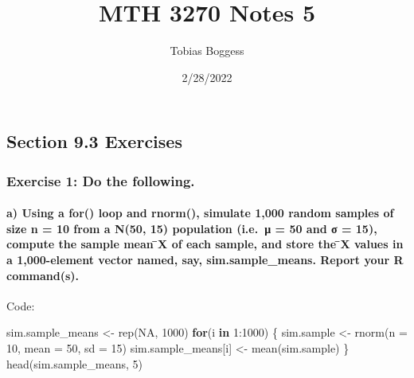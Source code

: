 \documentclass[
]{article}
\title{MTH 3270 Notes 5}
\author{Tobias Boggess}
\date{2/28/2022}
\newenvironment{Shaded}{\begin{snugshade}}{\end{snugshade}}
\newcommand{\AttributeTok}[1]{\textcolor[rgb]{0.77,0.63,0.00}{#1}}
\newcommand{\ConstantTok}[1]{\textcolor[rgb]{0.00,0.00,0.00}{#1}}
\newcommand{\ControlFlowTok}[1]{\textcolor[rgb]{0.13,0.29,0.53}{\textbf{#1}}}
\newcommand{\DecValTok}[1]{\textcolor[rgb]{0.00,0.00,0.81}{#1}}
\newcommand{\FunctionTok}[1]{\textcolor[rgb]{0.00,0.00,0.00}{#1}}
\newcommand{\NormalTok}[1]{#1}
\newcommand{\OtherTok}[1]{\textcolor[rgb]{0.56,0.35,0.01}{#1}}
\newcommand{\SpecialCharTok}[1]{\textcolor[rgb]{0.00,0.00,0.00}{#1}}
\begin{document}
\maketitle

\hypertarget{section-9.3-exercises}{%
\subsection{Section 9.3 Exercises}\label{section-9.3-exercises}}

\hypertarget{exercise-1-do-the-following.}{%
\subsubsection{Exercise 1: Do the
following.}\label{exercise-1-do-the-following.}}

\hypertarget{a-using-a-for-loop-and-rnorm-simulate-1000-random-samples-of-size-n-10-from-a-n50-15-population-i.e.-ux3bc-50-and-ux3c3-15-compute-the-sample-mean-x-of-each-sample-and-store-the-x-values-in-a-1000-element-vector-named-say-sim.sample_means.-report-your-r-commands.}{%
\paragraph{a) Using a for() loop and rnorm(), simulate 1,000 random
samples of size n = 10 from a N(50, 15) population (i.e.~μ = 50 and σ =
15), compute the sample mean ̄X of each sample, and store the ̄X values
in a 1,000-element vector named, say, sim.sample\_means. Report your R
command(s).}\label{a-using-a-for-loop-and-rnorm-simulate-1000-random-samples-of-size-n-10-from-a-n50-15-population-i.e.-ux3bc-50-and-ux3c3-15-compute-the-sample-mean-x-of-each-sample-and-store-the-x-values-in-a-1000-element-vector-named-say-sim.sample_means.-report-your-r-commands.}}

Code:

\begin{Shaded}
\begin{Highlighting}[]
\NormalTok{sim.sample\_means }\OtherTok{\textless{}{-}} \FunctionTok{rep}\NormalTok{(}\ConstantTok{NA}\NormalTok{, }\DecValTok{1000}\NormalTok{)}
\ControlFlowTok{for}\NormalTok{(i }\ControlFlowTok{in} \DecValTok{1}\SpecialCharTok{:}\DecValTok{1000}\NormalTok{) \{}
\NormalTok{  sim.sample }\OtherTok{\textless{}{-}} \FunctionTok{rnorm}\NormalTok{(}\AttributeTok{n =} \DecValTok{10}\NormalTok{, }\AttributeTok{mean =} \DecValTok{50}\NormalTok{, }\AttributeTok{sd =} \DecValTok{15}\NormalTok{)}
\NormalTok{  sim.sample\_means[i] }\OtherTok{\textless{}{-}} \FunctionTok{mean}\NormalTok{(sim.sample)}
\NormalTok{\}}
\FunctionTok{head}\NormalTok{(sim.sample\_means, }\DecValTok{5}\NormalTok{)}
\end{Highlighting}
\end{Shaded}
\end{document}
